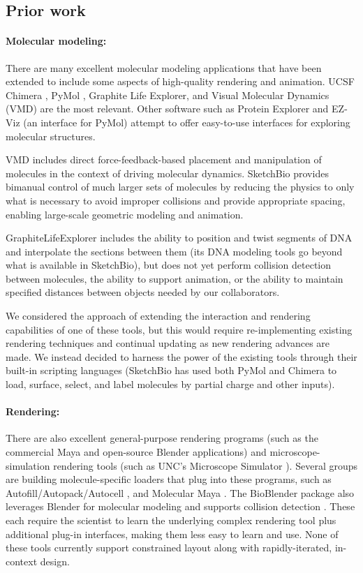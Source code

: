 \documentclass[twocolumn]{bmcart}%
\begin{document}
\subsection*{Prior work}
\paragraph*{Molecular modeling:}
There are many excellent molecular modeling applications that have been extended to include some aspects of high-quality rendering and animation.
UCSF Chimera \cite{pettersen2004ucsf}, PyMol \cite{pymol2013}, Graphite Life Explorer\cite{hornus2013easy}, and Visual Molecular Dynamics (VMD) \cite{humphrey1996} are the most relevant.
Other software such as Protein Explorer \cite{martz2002protein} and EZ-Viz \cite{grell2006ez} (an interface for PyMol) attempt to offer easy-to-use interfaces for exploring molecular structures.

VMD includes direct force-feedback-based placement and manipulation of molecules in the context of driving molecular dynamics.  SketchBio provides bimanual control of much larger sets of molecules by reducing the physics to only what is necessary to avoid improper collisions and provide appropriate spacing, enabling large-scale geometric modeling and animation.

GraphiteLifeExplorer includes the ability to position and twist segments of DNA and interpolate the sections between them (its DNA modeling tools go beyond what is available in SketchBio), but does not yet perform collision detection between molecules, the ability to support animation, or the ability to maintain specified distances between objects needed by our collaborators.

We considered the approach of extending the interaction and rendering capabilities of one of these tools, but this would require re-implementing existing rendering techniques and continual updating as new rendering advances are made.
We instead decided to harness the power of the existing tools through their built-in scripting languages (SketchBio has used both PyMol and Chimera to load, surface, select, and label molecules by partial charge and other inputs).

\paragraph*{Rendering:}
There are also excellent general-purpose rendering programs (such as the commercial Maya and open-source Blender applications) and microscope-simulation rendering tools (such as UNC's Microscope Simulator \cite{quammen2008}).
Several groups are building molecule-specific loaders that plug into these programs, such as Autofill/Autopack/Autocell \cite{Johnson2013}, and Molecular Maya \cite{molecularmaya}. The BioBlender package also leverages Blender for molecular modeling and supports collision detection \cite{zini2010bioblender}. These each require the scientist to learn the underlying complex rendering tool plus additional plug-in interfaces, making them less easy to learn and use. None of these tools currently support constrained layout along with rapidly-iterated, in-context design.
\end{document}
